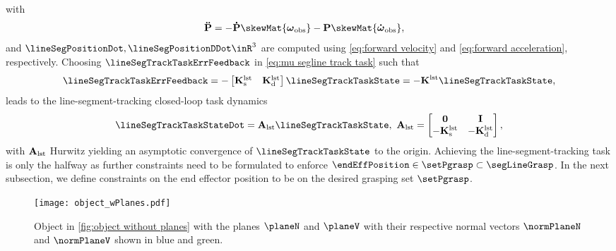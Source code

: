 		with
		\begin{align}
			\mathbf{\ddot{P}}&=-\mathbf{\dot{P}}\skewMat{\boldsymbol{\omega}_{\rm obs}} -\mathbf{P}\skewMat{\boldsymbol{\dot{\omega}}_{\rm obs}},
		\end{align}
		and $\lineSegPositionDot,\lineSegPositionDDot\inR^3$ are computed using \cref{eq:forward velocity} and \cref{eq:forward acceleration}, respectively.
		Choosing $\lineSegTrackTaskErrFeedback$ in \cref{eq:mu segline track task} such that 
		\begin{equation}
			\lineSegTrackTaskErrFeedback = -\begin{bmatrix} \mathbf{K}_{\rm s}^{\rm lst} &\mathbf{K}_{\rm d}^{\rm lst}\end{bmatrix}\lineSegTrackTaskState = - \mathbf{K}^{\rm lst}\lineSegTrackTaskState,
		\end{equation} leads to the line-segment-tracking closed-loop task dynamics
		\begin{equation}
			\lineSegTrackTaskStateDot = \mathbf{A}_{\rm lst}\lineSegTrackTaskState, \ \mathbf{A}_{\rm lst} = \begin{bmatrix}
				\mathbf{0} &\mathbf{I} \\ -\mathbf{K}_{\rm s}^{\rm lst} & -\mathbf{K}_{\rm d}^{\rm lst}
			\end{bmatrix},
		\end{equation}
		with $\mathbf{A}_{\rm lst}$ Hurwitz yielding an asymptotic convergence of $\lineSegTrackTaskState$ to the origin. Achieving the line-segment-tracking task is only the halfway as further constraints need to be formulated to enforce $\endEffPosition\in\setPgrasp\subset\segLineGrasp$. In the next subsection, we define constraints on the end effector position to be on the desired grasping set $\setPgrasp$.
		\begin{figure}
			\centering
			\texttt{[image: object\_wPlanes.pdf]}
			\caption{Object in \cref{fig:object without planes} with the planes $\planeN$ and $\planeV$ with their respective normal vectors $\normPlaneN$ and $\normPlaneV$ shown in blue and green.}
			\label{fig:object with 2 planes}
		\end{figure}
